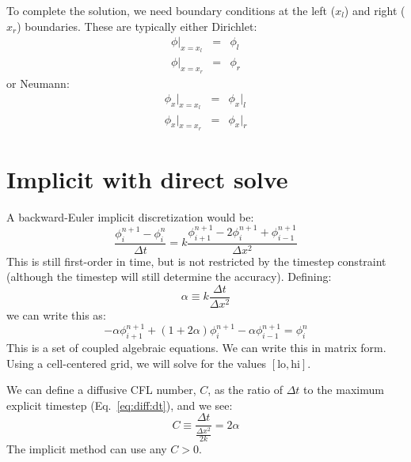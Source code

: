 To complete the solution, we need boundary conditions at the left
($x_l$) and right ($x_r$) boundaries.  These are typically either
Dirichlet:
\begin{eqnarray}
\phi |_{x=x_l} &=& \phi_l\\
\phi |_{x=x_r} &=& \phi_r
\end{eqnarray}
or Neumann:
\begin{eqnarray}
\phi_x |_{x=x_l} &=& \phi_x |_l\\
\phi_x |_{x=x_r} &=& \phi_x |_r
\end{eqnarray}

\section{Implicit with direct solve}

A backward-Euler implicit discretization would be:
\begin{equation}
\frac{\phi_i^{n+1} - \phi_i^n}{\Delta t} = 
  k \frac{\phi_{i+1}^{n+1} - 2\phi_i^{n+1} + \phi_{i-1}^{n+1}}{\Delta x^2}
\end{equation}
This is still first-order in time, but is not restricted by the timestep
constraint (although the timestep will still determine the accuracy).  
Defining:
\begin{equation}
\alpha \equiv k \frac{\Delta t}{\Delta x^2}
\end{equation}
we can write this as:
\begin{equation}
\label{eq:diff:implicit}
-\alpha \phi_{i+1}^{n+1} + (1 + 2\alpha) \phi_{i}^{n+1} - \alpha \phi_{i-1}^{n+1} = \phi_i^n
\end{equation}
This is a set of coupled algebraic equations.  We can write this in
matrix form.  Using a cell-centered grid, we will solve for the values
$[\mathrm{lo},\mathrm{hi}]$.  

We can define a diffusive CFL number, $C$, as the ratio of $\Delta t$ to the 
maximum explicit timestep (Eq.~\ref{eq:diff:dt}), and we see:
\begin{equation}
C \equiv \frac{\Delta t}{\frac{\Delta x^2}{2 k}} = 2\alpha
\end{equation}
The implicit method can use any $C > 0$.

